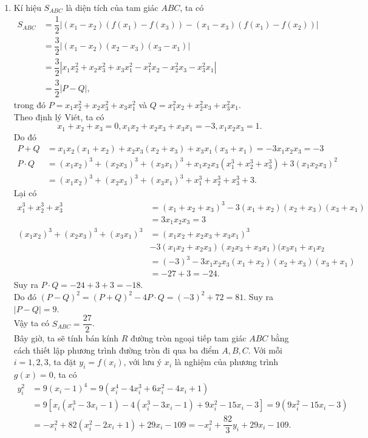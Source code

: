 \begin{bt}
{\begin{enumerate}
 \item Kí hiệu $S_{ABC}$ là diện tích của tam giác $ABC$, ta có
 {\allowdisplaybreaks
 \begin{align*}
 S_{ABC}&=\dfrac{1}{2}\left|(x_1-x_2)(f(x_1)-f(x_3))-(x_1-x_3)(f(x_1)-f(x_2))\right|\\
 &=\dfrac{3}{2}\left|(x_1-x_2)(x_2-x_3)(x_3-x_1)\right|\\
&=\dfrac{3}{2}\left|x_1x_2^2+x_2x_3^2+x_3x_1^2-x_1^2x_2-x_2^2x_3-x_3^2x_1\right|\\
&=\dfrac{3}{2}\left|P-Q\right|,
  \end{align*}}trong đó $P=x_1x_2^2+x_2x_3^2+x_3x_1^2$ và $Q=x_1^2x_2+x_2^2x_3+x_3^2x_1$. \\
 Theo định lý Viét, ta có 
 $$x_1+x_2+x_3=0, x_1x_2+x_2x_3+x_3x_1=-3, x_1x_2x_3=1.$$
 Do đó
 {\allowdisplaybreaks
 	\begin{align*} P+Q&=x_1x_2(x_1+x_2)+x_2x_3(x_2+x_3)+x_3x_1(x_3+x_1)=-3x_1x_2x_3=-3\\
 P\cdot Q&=(x_1x_2)^3+(x_2x_3)^3+(x_3x_1)^3+x_1x_2x_3(x_1^3+x_2^3+x_3^3)+3(x_1x_2x_3)^2\\
&=(x_1x_2)^3+(x_2x_3)^3+(x_3x_1)^3+x_1^3+x_2^3+x_3^3+3.
 \end{align*}}Lại có
{\allowdisplaybreaks
	\begin{align*} x_1^3+x_2^3+x_3^3&=(x_1+x_2+x_3)^3-3(x_1+x_2)(x_2+x_3)(x_3+x_1)\\
	&=3x_1x_2x_3=3\\
(x_1x_2)^3+(x_2x_3)^3+(x_3x_1)^3&=(x_1x_2+x_2x_3+x_3x_1)^3\\
&-3(x_1x_2+x_2x_3)(x_2x_3+x_3x_1)(x_3x_1+x_1x_2\\
 &=(-3)^3-3x_1x_2x_3(x_1+x_2)(x_2+x_3)(x_3+x_1)\\
 &=-27+3=-24.
 \end{align*}}Suy ra $P\cdot Q=-24+3+3=-18.$ \\
 Do đó $(P-Q)^2=(P+Q)^2-4P\cdot Q=(-3)^2+72=81.$ Suy ra $\left |P-Q\right|=9$. \\
 Vậy ta có $S_{ABC}=\dfrac{27}{2}$.\\
 Bây giờ, ta sẽ tính bán kính $R$ đường tròn ngoại tiếp tam giác $ABC$ bằng cách thiết lập phương trình đường tròn đi qua ba điểm $A, B, C$. Với mỗi $i=1,2,3$, ta đặt $y_i=f(x_i)$, với lưu ý $x_i$ là nghiệm của phương trình $g(x)=0$, ta có
 {\allowdisplaybreaks
 \begin{align*}
 y_i^2&=9(x_i-1)^4=9(x_i^4-4x_i^3+6x_i^2-4x_i+1)\\
 &=9[x_i(x_i^3-3x_i-1)-4(x_i^3-3x_i-1)+9x_i^2-15x_i-3]=9(9x_i^2-15x_i-3)\\
 &=-x_i^2+82(x_i^2-2x_i+1)+29x_i-109=-x_i^2+\dfrac{82}{3}y_i+29x_i-109.
 \end{align*}}
 

\end{enumerate}}
\end{bt}
